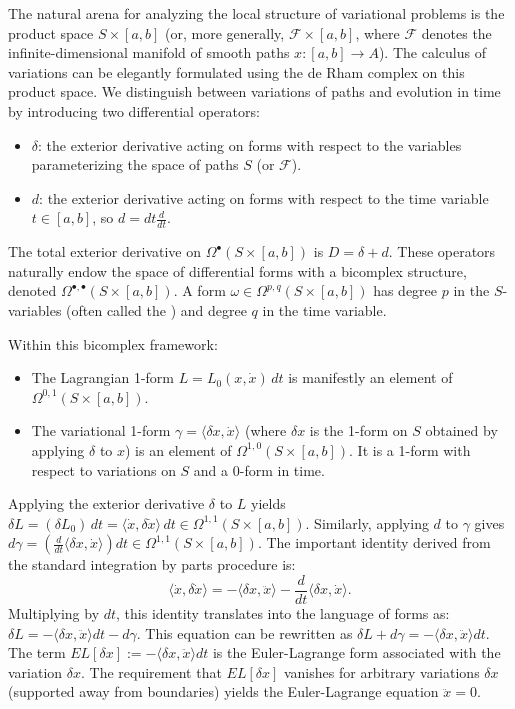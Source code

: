 The natural arena for analyzing the local structure of variational problems is the product space $S \times [a,b]$ (or, more generally, $\mathcal{F} \times [a,b]$, where $\mathcal{F}$ denotes the infinite-dimensional manifold of smooth paths $x: [a,b] \to A$). The calculus of variations can be elegantly formulated using the de Rham complex on this product space. We distinguish between variations of paths and evolution in time by introducing two differential operators:
\begin{itemize}
    \item $\delta$: the exterior derivative acting on forms with respect to the variables parameterizing the space of paths $S$ (or $\mathcal{F}$).
    \item $d$: the exterior derivative acting on forms with respect to the time variable $t \in [a,b]$, so $d = dt \frac{d}{dt}$.
\end{itemize}
The total exterior derivative on $\Omega^\bullet(S \times [a,b])$ is $D = \delta + d$. These operators naturally endow the space of differential forms with a bicomplex structure, denoted $\Omega^{\bullet,\bullet}(S \times [a,b])$. A form $\omega \in \Omega^{p,q}(S \times [a,b])$ has degree $p$ in the $S$-variables (often called the ) and degree $q$ in the time variable.

Within this bicomplex framework:
\begin{itemize}
    \item The Lagrangian 1-form $L = L_0(x,\dot{x}) \, dt$ is manifestly an element of $\Omega^{0,1}(S \times [a,b])$.
    \item The variational 1-form $\gamma = \langle \delta x, \dot{x} \rangle$ (where $\delta x$ is the 1-form on $S$ obtained by applying $\delta$ to $x$) is an element of $\Omega^{1,0}(S \times [a,b])$. It is a 1-form with respect to variations on $S$ and a 0-form in time.
\end{itemize}
Applying the exterior derivative $\delta$ to $L$ yields $\delta L = (\delta L_0) \, dt = \langle \dot{x}, \delta \dot{x} \rangle \, dt \in \Omega^{1,1}(S \times [a,b])$. Similarly, applying $d$ to $\gamma$ gives $d\gamma = \left(\frac{d}{dt}\langle \delta x, \dot{x} \rangle\right) dt \in \Omega^{1,1}(S \times [a,b])$.
The important identity derived from the standard integration by parts procedure is:
\begin{equation} \label{eq:IBP_identity}
\langle \dot{x}, \delta \dot{x} \rangle = -\langle \delta x, \ddot{x} \rangle - \frac{d}{dt}\langle \delta x, \dot{x} \rangle.
\end{equation}
Multiplying by $dt$, this identity translates into the language of forms as:
$ \delta L = -\langle \delta x, \ddot{x} \rangle dt - d\gamma. $
This equation can be rewritten as $\delta L + d\gamma = -\langle \delta x, \ddot{x} \rangle dt$. The term $EL[\delta x] := -\langle \delta x, \ddot{x} \rangle dt$ is the Euler-Lagrange form associated with the variation $\delta x$. The requirement that $EL[\delta x]$ vanishes for arbitrary variations $\delta x$ (supported away from boundaries) yields the Euler-Lagrange equation $\ddot{x}=0$.

